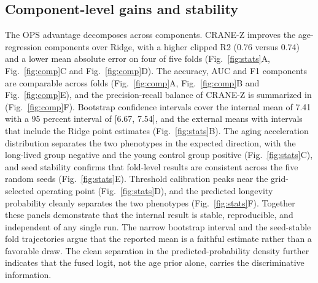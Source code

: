\documentclass[11pt,a4paper]{article}
\begin{document}
\subsection{Component-level gains and stability}\label{sec:res2}
The OPS advantage decomposes across components. CRANE-Z improves the age-regression components over Ridge, with a higher clipped R2 (0.76 versus 0.74) and a lower mean absolute error on four of five folds (Fig.~\ref{fig:stats}A, Fig.~\ref{fig:comp}C and Fig.~\ref{fig:comp}D). The accuracy, AUC and F1 components are comparable across folds (Fig.~\ref{fig:comp}A, Fig.~\ref{fig:comp}B and Fig.~\ref{fig:comp}E), and the precision-recall balance of CRANE-Z is summarized in (Fig.~\ref{fig:comp}F). Bootstrap confidence intervals cover the internal mean of 7.41 with a 95 percent interval of [6.67, 7.54], and the external means with intervals that include the Ridge point estimates (Fig.~\ref{fig:stats}B). The aging acceleration distribution separates the two phenotypes in the expected direction, with the long-lived group negative and the young control group positive (Fig.~\ref{fig:stats}C), and seed stability confirms that fold-level results are consistent across the five random seeds (Fig.~\ref{fig:stats}E). Threshold calibration peaks near the grid-selected operating point (Fig.~\ref{fig:stats}D), and the predicted longevity probability cleanly separates the two phenotypes (Fig.~\ref{fig:stats}F). Together these panels demonstrate that the internal result is stable, reproducible, and independent of any single run. The narrow bootstrap interval and the seed-stable fold trajectories argue that the reported mean is a faithful estimate rather than a favorable draw. The clean separation in the predicted-probability density further indicates that the fused logit, not the age prior alone, carries the discriminative information.
\end{document}
